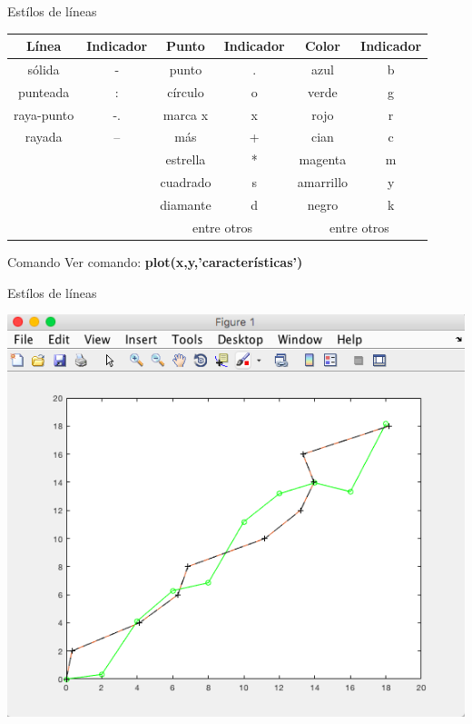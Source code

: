 \documentclass{bredelebeamer}
\begin{document}
\begin{frame}{Estílos de líneas}
\begin{table}[]
\centering
\begin{tabular}{|c|c|c|c|c|c|}
\hline
Línea      & Indicador & Punto          & Indicador       & Color           & Indicador      \\ \hline
sólida     & -         & punto          & .               & azul            & b              \\ \hline
punteada   & :         & círculo        & o               & verde           & g              \\ \hline
raya-punto & -.        & marca x        & x               & rojo            & r              \\ \hline
rayada     & --        & más            & +               & cian            & c              \\ \hline
           &           & estrella       & *               & magenta         & m              \\ \hline
           &           & cuadrado       & s               & amarrillo       & y              \\ \hline
           &           & diamante       & d               & negro           & k              \\ \hline
           &           & \multicolumn{2}{c|}{entre otros} & \multicolumn{2}{c|}{entre otros} \\ \hline
\end{tabular}
\end{table}
\begin{exampleblock}{Comando}
Ver comando: \textbf{plot(x,y,'características')}
\end{exampleblock}
\end{frame}

\begin{frame}{Estílos de líneas}
\begin{center}
\includegraphics[scale=0.35]{images/pantalla17.png}
\end{center}
\end{frame}
\end{document}

